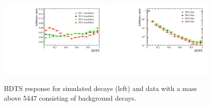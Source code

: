 \begin{figure}[htbp]
    \centering
        \includegraphics[width=0.49\textwidth]{./Figs/Selection/BDTS_signal_Feb6.pdf}
       \includegraphics[width=0.49\textwidth]{./Figs/Selection/BDTS_background_Feb6.pdf}
    \caption{BDTS response for simulated \bsmumu decays (left) and data with a mass above 5447 \mevcc consisting of background decays.}
    \label{fig:FlatteningBDTS}
\end{figure}

